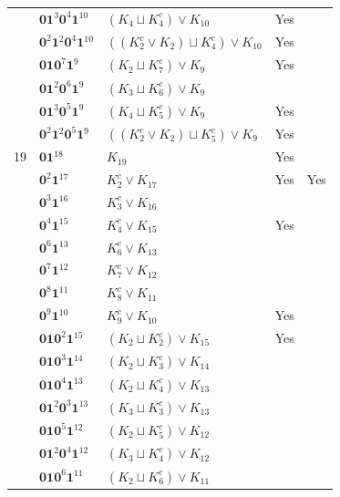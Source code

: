 \documentclass[preprint]{elsarticle}
\begin{document}
\begin{center}
\begin{longtable}{p{0.7cm} p{2cm} p{4cm} p{1cm} p{0cm}}
&$\mathbf{0}\mathbf{1}^3 \mathbf{0}^4 \mathbf{1}^{10}$ & $( K_{4} \sqcup K_{4}^c )\vee K_{10}$ & Yes&\\
&$\mathbf{0}^2 \mathbf{1}^2 \mathbf{0}^4 \mathbf{1}^{10}$ & $( (K_{2}^c \vee K_{2} )\sqcup K_{4}^c) \vee K_{10}$ &Yes &\\
&$\mathbf{0}\mathbf{1}\mathbf{0}^7 \mathbf{1}^9$ & $ (K_{2} \sqcup K_{7}^c )\vee K_{9}$ & Yes&\\
&$\mathbf{0}\mathbf{1}^2 \mathbf{0}^6 \mathbf{1}^9$ & $( K_{3} \sqcup K_{6}^c )\vee K_{9}$ & &\\
&$\mathbf{0}\mathbf{1}^3 \mathbf{0}^5 \mathbf{1}^9$ & $ (K_{4} \sqcup K_{5}^c )\vee K_{9}$ & Yes &\\
&$\mathbf{0}^2 \mathbf{1}^2 \mathbf{0}^5 \mathbf{1}^9$ & $( (K_{2}^c \vee K_{2}) \sqcup K_{5}^c )\vee K_{9}$ &Yes &\\
\hline
19&$\mathbf{0}\mathbf{1}^{18}$ & $ K_{19}$ &Yes &\\
&$\mathbf{0}^2 \mathbf{1}^{17}$ & $ K_{2}^c \vee K_{17}$ &Yes & Yes\\
&$\mathbf{0}^3 \mathbf{1}^{16}$ & $ K_{3}^c \vee K_{16}$ &  &\\
&$\mathbf{0}^4 \mathbf{1}^{15}$ & $ K_{4}^c \vee K_{15}$ &Yes &\\
&$\mathbf{0}^6 \mathbf{1}^{13}$ & $ K_{6}^c \vee K_{13}$ & &\\
&$\mathbf{0}^7 \mathbf{1}^{12}$ & $ K_{7}^c \vee K_{12}$ & &\\
&$\mathbf{0}^8 \mathbf{1}^{11}$ & $ K_{8}^c \vee K_{11}$ & &\\
&$\mathbf{0}^9 \mathbf{1}^{10}$ & $ K_{9}^c \vee K_{10}$ &Yes &\\
&$\mathbf{0} \mathbf{1} \mathbf{0}^2 \mathbf{1}^{15}$ & $ (K_{2} \sqcup K_{2}^c) \vee K_{15}$ &Yes &\\
&$\mathbf{0} \mathbf{1} \mathbf{0}^3 \mathbf{1}^{14}$ & $ (K_{2} \sqcup K_{3}^c) \vee K_{14}$ & &\\
&$\mathbf{0} \mathbf{1} \mathbf{0}^4 \mathbf{1}^{13}$ & $ (K_{2} \sqcup K_{4}^c) \vee K_{13}$ & &\\
&$\mathbf{0} \mathbf{1}^{2} \mathbf{0}^3 \mathbf{1}^{13}$ & $ (K_{3} \sqcup K_{3}^c) \vee K_{13}$ & &\\
&$\mathbf{0} \mathbf{1} \mathbf{0}^5 \mathbf{1}^{12}$ & $ (K_{2} \sqcup K_{5}^c) \vee K_{12}$ & &\\
&$\mathbf{0} \mathbf{1}^{2} \mathbf{0}^4 \mathbf{1}^{12}$ & $ (K_{3} \sqcup K_{4}^c) \vee K_{12}$ & &\\
&$\mathbf{0} \mathbf{1} \mathbf{0}^6 \mathbf{1}^{11}$ & $ (K_{2} \sqcup K_{6}^c) \vee K_{11}$ & &\\

\end{longtable}
\end{center}
\end{document}
